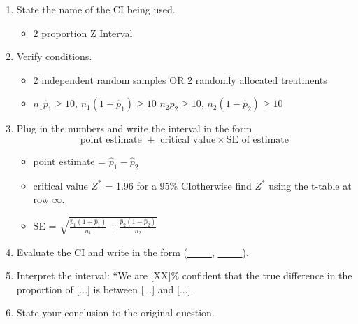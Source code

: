 \begin{termBox}{
\begin{enumerate}
\setlength{\itemsep}{0mm}
\item State the name of the CI being used.
\begin{itemize}
\item 2 proportion Z Interval
\end{itemize}
\item Verify conditions.
\begin{itemize}
\item 2 independent random samples OR 2 randomly allocated treatments
\item $n_1\hat{p}_1\geq10$, $n_1(1-\hat{p}_1)\geq10$  \newline $n_2\hat{p}_2\geq10$, $n_2(1-\hat{p}_2)\geq10$
\end{itemize}
\item Plug in the numbers and write the interval in the form
$$\text{point estimate } \pm \text{ critical value}\times \text{SE of estimate}$$
\begin{itemize}
\item point estimate = $\hat{p}_1-\hat{p}_2$
\item critical value $Z^*$ = 1.96 for a 95\% CI\newline otherwise find $Z^*$ using the t-table at row $\infty$.
\item SE = $\sqrt{\frac{\hat{p}_1(1-\hat{p}_1)}{n_1} + \frac{\hat{p}_2(1-\hat{p}_2)}{n_2}}$
\end{itemize}
\item Evaluate the CI and write in the form (\underline{\ \ \ \ \ }, \underline{\ \ \ \ \ }).
\item Interpret the interval: ``We are [XX]\% confident that the true difference in the proportion of [...] is between [...] and [...].
\item State your conclusion to the original question.
\end{enumerate}}
\end{termBox}

